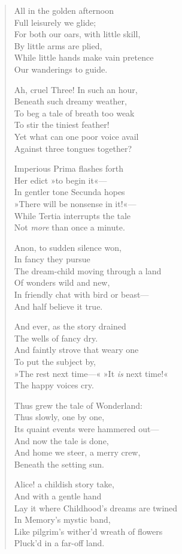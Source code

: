 
\begin{verse}
\begin{altverse}
All in the golden afternoon\\
Full leisurely we glide;\\
For both our oars, with little skill,\\
By little arms are plied,\\
While little hands make vain pretence\\
Our wanderings to guide.

Ah, cruel Three! In such an hour,\\
Beneath such dreamy weather,\\
To beg a tale of breath too weak\\
To stir the tiniest feather!\\
Yet what can one poor voice avail\\
Against three tongues together?

Imperious Prima flashes forth\\
Her edict »to begin it«—\\
In gentler tone Secunda hopes\\
»There will be nonsense in it!«—\\
While Tertia interrupts the tale\\
Not \textit{more} than once a minute.

Anon, to sudden silence won,\\
In fancy they pursue\\
The dream-child moving through a land\\
Of wonders wild and new,\\
In friendly chat with bird or beast—\\
And half believe it true.

\pagebreak[4]
And ever, as the story drained\\
The wells of fancy dry.\\
And faintly strove that weary one\\
To put the subject by,\\
»The rest next time—« »It \textit{is} next time!«\\
The happy voices cry.

Thus grew the tale of Wonderland:\\
Thus slowly, one by one,\\
Its quaint events were hammered out—\\
And now the tale is done,\\
And home we steer, a merry crew,\\
Beneath the setting sun.

Alice! a childish story take,\\
And with a gentle hand\\
Lay it where Childhood's dreams are twined\\
In Memory's mystic band,\\
Like pilgrim's wither'd wreath of flowers\\
Pluck'd in a far-off land.
\end{altverse}
\end{verse}